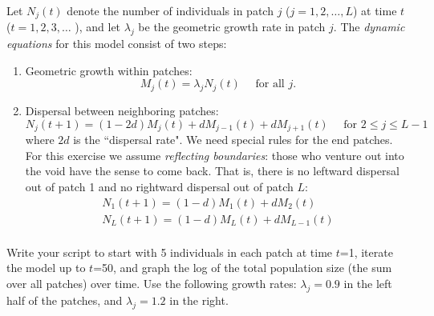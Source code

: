 \documentclass [11pt]{article}
\newcounter{exercise}
\numberwithin{exercise}{section}
\begin{document}
Let $N_j(t)$ denote the number of individuals in patch $j$ ($j=1,2,\ldots, L$) at 
time $t$ ($t=1,2,3,\ldots$ ), and let $\lambda _j$ be the geometric growth rate 
in patch $j$. The \textit{dynamic equations} for this model consist of two steps:
\begin{enumerate}
\item Geometric growth within patches: 
\begin{equation}
M_j(t) = \lambda _j N_j(t) \quad \mbox{ for all } j. 
\end{equation}
\item Dispersal between neighboring patches:
\begin{equation}
N_j(t + 1) = (1 - 2d)M_j(t) + dM_{j - 1}(t) + dM_{j + 1}(t) \quad \mbox{ for } 2 \le j \le L-1 
\label{disperse1}
\end{equation}
where $2d$ is the ``dispersal rate". We need special rules for the end patches. 
For this exercise we assume \textit{reflecting boundaries}: those who venture out 
into the void have the sense to come back. That is, there is no 
leftward dispersal out of patch 1 and no rightward dispersal out of patch $L$:
\begin{equation}
\begin{array}{l}
 N_1(t + 1) = (1 - d)M_1(t) + dM_2(t) \\ 
 N_L(t + 1) = (1 - d)M_L(t) + dM_{L - 1}(t) \\ 
\end{array}
\label{disperse2}
\end{equation}
\end{enumerate} 
Write your script to start with 5 individuals in each patch at 
time $t$=1, iterate the model up to $t$=50, and graph the log of the total population size (the sum over all patches) over time. Use the 
following growth rates: $\lambda _j = 0.9$ in the left half of the patches, 
and $\lambda _j = 1.2$ in the right. \\
\end{document}
